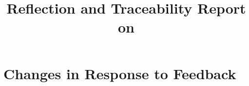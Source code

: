\documentclass{article}
\title{Reflection and Traceability Report on \progname}
\author{\authname}
\date{}
\begin{document}
\maketitle


\section{Changes in Response to Feedback}





\end{document}

